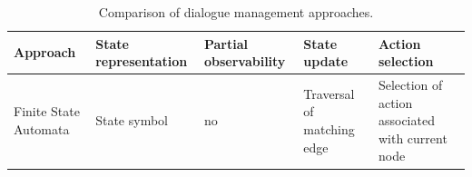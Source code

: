 \begin{table}[h]
\begin{center}
\begin{tabular}{|p{25mm}|p{25mm}|p{20mm}|p{25mm}|p{30mm}|} \hline
\centering \vspace{0mm} Approach &  \centering \vspace{-1mm} State representation &  \centering \vspace{-1mm} Partial observability &  \centering \vspace{0mm}State update &  \vspace{0mm}\centerline{Action selection} \\ \hline
Finite State Automata & State symbol & no & Traversal of matching edge & Selection of action associated with current node \\ 
\end{tabular}
\end{center}
\caption{Comparison of dialogue management approaches.}
\label{table:approaches}
\end{table}